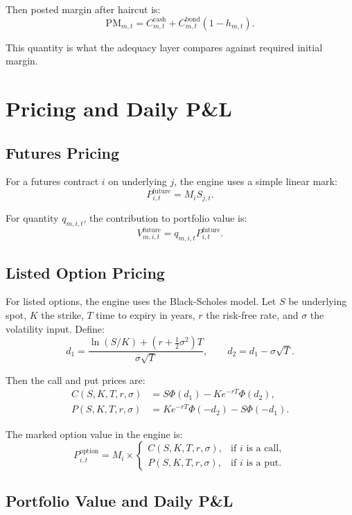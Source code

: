 \documentclass[11pt]{article}
\begin{document}
Then posted margin after haircut is:
\[
\text{PM}_{m,t}
= C_{m,t}^{\text{cash}} + C_{m,t}^{\text{bond}}(1-h_{m,t}).
\]

This quantity is what the adequacy layer compares against required initial margin.

\section{Pricing and Daily P\&L}

\subsection{Futures Pricing}

For a futures contract \(i\) on underlying \(j\), the engine uses a simple linear mark:
\[
P_{i,t}^{\text{future}} = M_i S_{j,t}.
\]

For quantity \(q_{m,i,t}\), the contribution to portfolio value is:
\[
V_{m,i,t}^{\text{future}} = q_{m,i,t} P_{i,t}^{\text{future}}.
\]

\subsection{Listed Option Pricing}

For listed options, the engine uses the Black-Scholes model. Let \(S\) be underlying spot, \(K\) the strike, \(T\) time to expiry in years, \(r\) the risk-free rate, and \(\sigma\) the volatility input. Define:
\[
d_1 = \frac{\ln(S/K) + \left(r + \tfrac{1}{2}\sigma^2\right)T}{\sigma\sqrt{T}},
\qquad
d_2 = d_1 - \sigma\sqrt{T}.
\]

Then the call and put prices are:
\begin{align*}
C(S,K,T,r,\sigma) &= S\Phi(d_1) - Ke^{-rT}\Phi(d_2),\\
P(S,K,T,r,\sigma) &= Ke^{-rT}\Phi(-d_2) - S\Phi(-d_1).
\end{align*}

The marked option value in the engine is:
\[
P_{i,t}^{\text{option}} = M_i \times
\begin{cases}
C(S,K,T,r,\sigma), & \text{if } i \text{ is a call},\\
P(S,K,T,r,\sigma), & \text{if } i \text{ is a put}.
\end{cases}
\]

\subsection{Portfolio Value and Daily P\&L}
\end{document}
